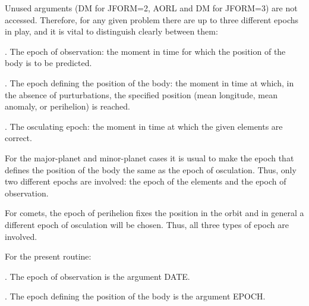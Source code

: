 \documentclass[twoside,11pt,nolof]{starlink}
\begin{document}
{{        Unused arguments (DM for JFORM=2, AORL and DM for JFORM=3) are not
        accessed.
        Therefore, for any given problem there are up to three different
        epochs in play, and it is vital to distinguish clearly between
        them:

        . The epoch of observation:  the moment in time for which the
          position of the body is to be predicted.

        . The epoch defining the position of the body:  the moment in time
          at which, in the absence of purturbations, the specified
          position (mean longitude, mean anomaly, or perihelion) is
          reached.

        . The osculating epoch:  the moment in time at which the given
          elements are correct.

        For the major-planet and minor-planet cases it is usual to make
        the epoch that defines the position of the body the same as the
        epoch of osculation.  Thus, only two different epochs are
        involved:  the epoch of the elements and the epoch of observation.

        For comets, the epoch of perihelion fixes the position in the
        orbit and in general a different epoch of osculation will be
        chosen.  Thus, all three types of epoch are involved.

        For the present routine:

        . The epoch of observation is the argument DATE.

        . The epoch defining the position of the body is the argument
          EPOCH.

}}
\end{document}
